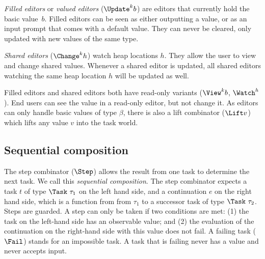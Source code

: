   \item
    \emph{Filled editors} or \emph{valued editors} ($\Update^k b$) are editors that currently hold the basic value~$b$.
    Filled editors can be seen as either outputting a value, or as an input prompt that comes with a default value.
    They can never be cleared, only updated with new values of the same type.

  \item
    \emph{Shared editors} ($\Change^k h$) watch heap locations $h$.
    They allow the user to view and change shared values.
    Whenever a shared editor is updated, all shared editors watching the same heap location $h$ will be updated as well.
\stopitemize

% 

Filled editors and shared editors both have read-only variants ($\View^k b$, $\Watch^ h$).
End users can see the value in a read-only editor, but not change it.
As editors can only handle basic values of type $\beta$,
there is also a lift combinator ($\Lift v$) which lifts any value $v$ into the task world.



\subsection{Sequential composition}

The step combinator ($\Step$) allows the result from one task to determine the next task.
We call this \textit{sequential composition}.
The step combinator expects a task $t$ of type $\Task\ \tau_1$ on the left hand side,
and a continuation $e$ on the right hand side, which is a function from from $\tau_1$ to a successor task of type $\Task\ \tau_2$.
Steps are guarded.
A step can only be taken if two conditions are met: (1) the task on the left-hand side has an observable value;
and (2) the evaluation of the continuation on the right-hand side with this value does not fail.
A failing task ($\Fail$) stands for an impossible task.
A task that is failing never has a value and never accepts input.

